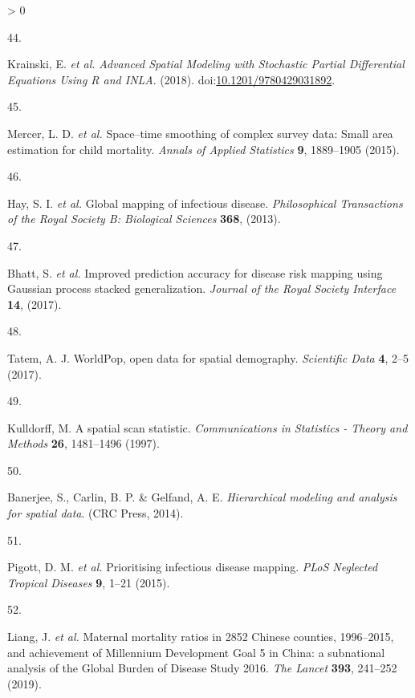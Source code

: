 \documentclass[
]{article}
\newlength{\cslhangindent}
\newlength{\csllabelwidth}
\newenvironment{CSLReferences}[2] %
 {%
  \setlength{\parindent}{0pt}
  \ifodd #1 \everypar{\setlength{\hangindent}{\cslhangindent}}\ignorespaces\fi
  \ifnum #2 > 0
  \setlength{\parskip}{#2\baselineskip}
  \fi
 }%
 {}
\newcommand{\CSLLeftMargin}[1]{\parbox[t]{\csllabelwidth}{#1}}
\newcommand{\CSLRightInline}[1]{\parbox[t]{\linewidth - \csllabelwidth}{#1}\break}
\begin{document}
\begin{CSLReferences}{0}{0}
\leavevmode\hypertarget{ref-Krainski2018}{}%
\CSLLeftMargin{44. }
\CSLRightInline{Krainski, E. \emph{et al.} \emph{{Advanced Spatial Modeling with Stochastic Partial Differential Equations Using R and INLA}}. (2018). doi:\href{https://doi.org/10.1201/9780429031892}{10.1201/9780429031892}.}

\leavevmode\hypertarget{ref-Mercer2015}{}%
\CSLLeftMargin{45. }
\CSLRightInline{Mercer, L. D. \emph{et al.} {Space--time smoothing of complex survey data: Small area estimation for child mortality}. \emph{Annals of Applied Statistics} \textbf{9}, 1889--1905 (2015).}

\leavevmode\hypertarget{ref-Hay2013}{}%
\CSLLeftMargin{46. }
\CSLRightInline{Hay, S. I. \emph{et al.} {Global mapping of infectious disease}. \emph{Philosophical Transactions of the Royal Society B: Biological Sciences} \textbf{368}, (2013).}

\leavevmode\hypertarget{ref-Bhatt2017}{}%
\CSLLeftMargin{47. }
\CSLRightInline{Bhatt, S. \emph{et al.} {Improved prediction accuracy for disease risk mapping using Gaussian process stacked generalization}. \emph{Journal of the Royal Society Interface} \textbf{14}, (2017).}

\leavevmode\hypertarget{ref-Tatem2017}{}%
\CSLLeftMargin{48. }
\CSLRightInline{Tatem, A. J. {WorldPop, open data for spatial demography}. \emph{Scientific Data} \textbf{4}, 2--5 (2017).}

\leavevmode\hypertarget{ref-Kulldorff1997}{}%
\CSLLeftMargin{49. }
\CSLRightInline{Kulldorff, M. {A spatial scan statistic}. \emph{Communications in Statistics - Theory and Methods} \textbf{26}, 1481--1496 (1997).}

\leavevmode\hypertarget{ref-Banerjee2014}{}%
\CSLLeftMargin{50. }
\CSLRightInline{Banerjee, S., Carlin, B. P. \& Gelfand, A. E. \emph{{Hierarchical modeling and analysis for spatial data}}. (CRC Press, 2014).}

\leavevmode\hypertarget{ref-Pigott2015}{}%
\CSLLeftMargin{51. }
\CSLRightInline{Pigott, D. M. \emph{et al.} {Prioritising infectious disease mapping}. \emph{PLoS Neglected Tropical Diseases} \textbf{9}, 1--21 (2015).}

\leavevmode\hypertarget{ref-Liang2019}{}%
\CSLLeftMargin{52. }
\CSLRightInline{Liang, J. \emph{et al.} {Maternal mortality ratios in 2852 Chinese counties, 1996--2015, and achievement of Millennium Development Goal 5 in China: a subnational analysis of the Global Burden of Disease Study 2016}. \emph{The Lancet} \textbf{393}, 241--252 (2019).}


\end{CSLReferences}
\end{document}
